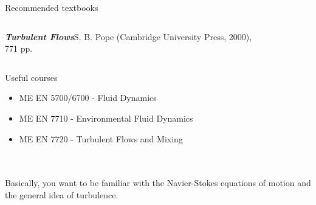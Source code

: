 \begin{frame}{Recommended textbooks}

\setlength{\fboxsep}{0pt}
\setlength{\fboxrule}{1pt}
\begin{columns}[T]
    \begin{column}{.75\textwidth}
      \begin{minipage}[c][.47\textheight][c]{\linewidth}
      \emph{\textbf{Turbulent Flows}}\newline S. B. Pope (Cambridge University Press, 2000),\\ 771 pp.
      \end{minipage}
    \end{column}
    \begin{column}{.25\textwidth}
    \end{column}
  \end{columns}
\end{frame}


\begin{frame}{Useful courses}
\begin{itemize}
\item ME EN 5700/6700 - Fluid Dynamics
\item ME EN 7710 - Environmental Fluid Dynamics
\item ME EN 7720 - Turbulent Flows and Mixing
\end{itemize}
~\\~\\
Basically, you want to be familiar with the Navier-Stokes equations of motion and the general idea of turbulence.
\end{frame}

